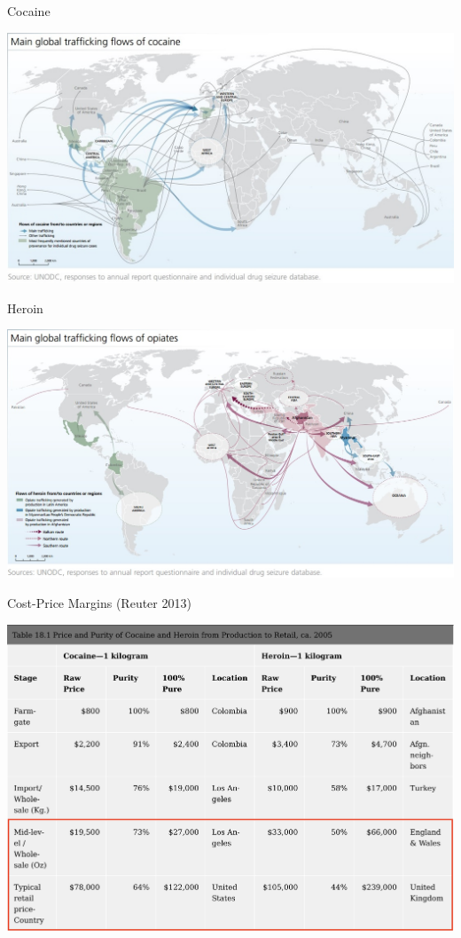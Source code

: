 \documentclass[10pt,ignorenonframetext,]{beamer}
\begin{document}
\begin{frame}{Cocaine}
\protect\hypertarget{cocaine}{}

\includegraphics{../chicago/figs/cocaine_supply_map.jpg}

\end{frame}

\begin{frame}{Heroin}
\protect\hypertarget{heroin}{}

\includegraphics{../chicago/figs/opium_supply_map.jpg}

\end{frame}

\begin{frame}{Cost-Price Margins (Reuter 2013)}
\protect\hypertarget{cost-price-margins-reuter2010}{}

\includegraphics{../chicago/figs/Reuter_costprice.png}

\end{frame}
\end{document}
